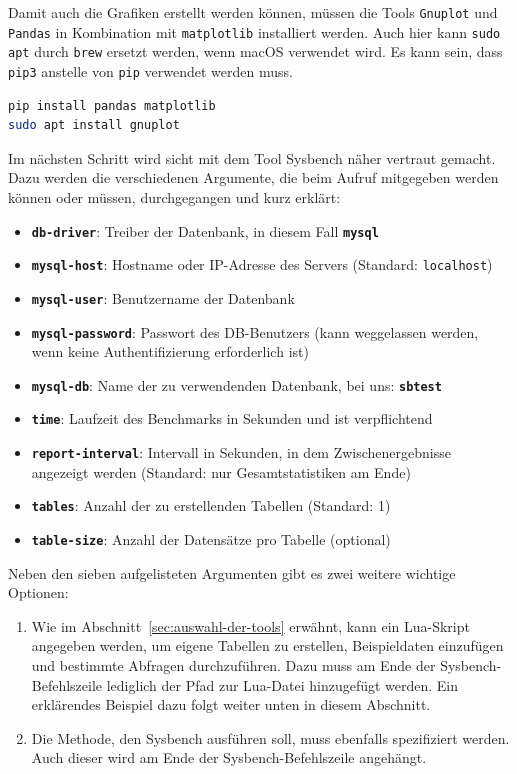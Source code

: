 Damit auch die Grafiken erstellt werden können, müssen die Tools \texttt{Gnuplot} und \texttt{Pandas} in Kombination mit \texttt{matplotlib} installiert werden.
Auch hier kann \texttt{sudo apt} durch \texttt{brew} ersetzt werden, wenn macOS verwendet wird.
Es kann sein, dass \texttt{pip3} anstelle von \texttt{pip} verwendet werden muss.

\vspace{-5pt}
\begin{lstlisting}[language=bash]
pip install pandas matplotlib
sudo apt install gnuplot
\end{lstlisting}
\vspace{-9pt}

Im nächsten Schritt wird sicht mit dem Tool Sysbench näher vertraut gemacht.
Dazu werden die verschiedenen Argumente, die beim Aufruf mitgegeben werden können oder müssen, durchgegangen und kurz erklärt:

\vspace{-5pt}
\begin{itemize}
    \setlength{\itemsep}{-7pt}
    \item \textbf{\texttt{db-driver}}: Treiber der Datenbank, in diesem Fall \textbf{\texttt{mysql}}
    \item \textbf{\texttt{mysql-host}}: Hostname oder IP-Adresse des Servers (Standard: \texttt{localhost})
    \item \textbf{\texttt{mysql-user}}: Benutzername der Datenbank
    \item \textbf{\texttt{mysql-password}}: Passwort des DB-Benutzers (kann weggelassen werden, wenn keine Authentifizierung erforderlich ist)
    \item \textbf{\texttt{mysql-db}}: Name der zu verwendenden Datenbank, bei uns: \textbf{\texttt{sbtest}}
    \item \textbf{\texttt{time}}: Laufzeit des Benchmarks in Sekunden und ist verpflichtend
    \item \textbf{\texttt{report-interval}}: Intervall in Sekunden, in dem Zwischenergebnisse angezeigt werden (Standard: nur Gesamtstatistiken am Ende)
    \item \textbf{\texttt{tables}}: Anzahl der zu erstellenden Tabellen (Standard: 1)
    \item \textbf{\texttt{table-size}}: Anzahl der Datensätze pro Tabelle (optional)
\end{itemize}

Neben den sieben aufgelisteten Argumenten gibt es zwei weitere wichtige Optionen:
\begin{enumerate}
    \item Wie im Abschnitt~\ref{sec:auswahl-der-tools} erwähnt, kann ein Lua-Skript angegeben werden, um eigene Tabellen zu erstellen, Beispieldaten einzufügen und bestimmte Abfragen durchzuführen.
    Dazu muss am Ende der Sysbench-Befehlszeile lediglich der Pfad zur Lua-Datei hinzugefügt werden.
    Ein erklärendes Beispiel dazu folgt weiter unten in diesem Abschnitt.
    \item Die Methode, den Sysbench ausführen soll, muss ebenfalls spezifiziert werden.
    Auch dieser wird am Ende der Sysbench-Befehlszeile angehängt.
\end{enumerate}

